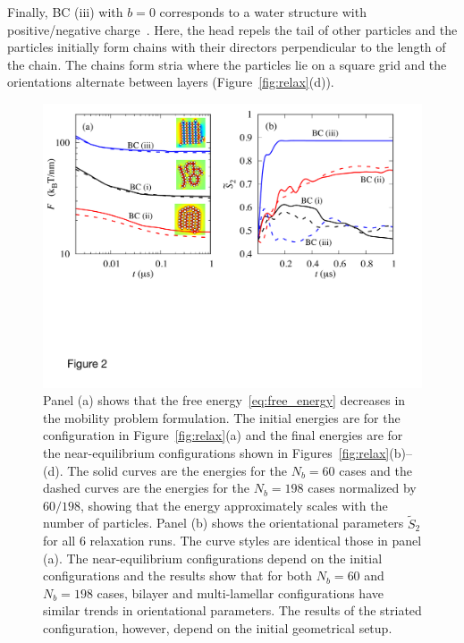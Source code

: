 \documentclass[prb,preprint,showpacs,preprintnumbers,amsmath,amssymb,longbibliography]{revtex4-1}
\begin{document}
Finally, BC (iii) with $b=0$ corresponds to a water structure with
positive/negative charge~\cite{MaRa76, Ma77}. Here, the head repels the
tail of other particles and the particles initially form chains with
their directors perpendicular to the length of the chain. The chains
form stria where the particles lie on a square grid and the orientations
alternate between layers (Figure~\ref{fig:relax}(d)).

\begin{figure}
  \begin{center}
\includegraphics[width=1.0\textwidth]{Figures/Figure2.pdf}
  \end{center}
  \vspace{-20pt}
  \caption{\label{fig:relax_energy}
  Panel (a) shows that the free energy~\eqref{eq:free_energy} decreases
  in the mobility problem formulation. The initial energies are for the
  configuration in Figure~\ref{fig:relax}(a) and the final energies are
  for the near-equilibrium configurations shown in
  Figures~\ref{fig:relax}(b)--(d). The solid curves are the energies for
  the $N_b=60$ cases and the dashed curves are the energies for the $N_b
  = 198$ cases normalized by $60/198$, showing that the energy
  approximately scales with the number of particles.  Panel (b) shows
  the orientational parameters $\tilde{S}_2$ for all 6 relaxation runs.
  The curve styles are identical those in panel (a). The
  near-equilibrium configurations depend on the initial configurations
  and the results show that for both $N_b=60$ and $N_b=198$ cases,
  bilayer and multi-lamellar configurations have similar trends in
  orientational parameters. The results of the striated configuration,
  however, depend on the initial geometrical setup.}
\end{figure}
\end{document}
